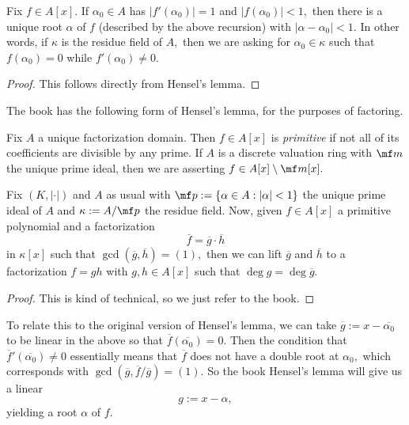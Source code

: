 \begin{corollary}
	Fix $f\in A[x].$ If $\alpha_0\in A$ has $|f'(\alpha_0)|=1$ and $|f(\alpha_0)|<1,$ then there is a unique root $\alpha$ of $f$ (described by the above recursion) with $|\alpha-\alpha_0|<1.$ In other words, if $\kappa$ is the residue field of $A,$ then we are asking for $\alpha_0\in\kappa$ such that $f(\alpha_0)=0$ while $f'(\alpha_0)\ne0.$
\end{corollary}
\begin{proof}
	This follows directly from Hensel's lemma.
\end{proof}
The book has the following form of Hensel's lemma, for the purposes of factoring.
\begin{definition}[Primitive]
	Fix $A$ a unique factorization domain. Then $f\in A[x]$ is \textit{primitive} if not all of its coefficients are divisible by any prime. If $A$ is a discrete valuation ring with $\mf m$ the unique prime ideal, then we are asserting $f\in A[x]\setminus\mf m[x].$
\end{definition}
\begin{lemma}[Hensel, II]
	Fix $(K,|\cdot|)$ and $A$ as usual with $\mf p:=\{\alpha\in A:|\alpha|<1\}$ the unique prime ideal of $A$ and $\kappa:=A/\mf p$ the residue field. Now, given $f\in A[x]$ a primitive polynomial and a factorization
	\[\overline f=\overline g\cdot\overline h\]
	in $\kappa[x]$ such that $\gcd(\overline g,\overline h)=(1),$ then we can lift $\overline g$ and $\overline h$ to a factorization $f=gh$ with $g,h\in A[x]$ such that $\deg g=\deg\overline g.$
\end{lemma}
\begin{proof}
	This is kind of technical, so we just refer to the book.
\end{proof}
\begin{remark}
	To relate this to the original version of Hensel's lemma, we can take $\overline g:=x-\overline{\alpha_0}$ to be linear in the above so that $\overline f(\overline{\alpha_0})=0.$ Then the condition that $\overline f'(\overline{\alpha_0})\ne0$ essentially means that $\overline f$ does not have a double root at $\alpha_0,$ which corresponds with $\gcd(\overline g,\overline f/\overline g)=(1).$ So the book Hensel's lemma will give us a linear
	\[g:=x-\alpha,\]
	yielding a root $\alpha$ of $f.$
\end{remark}

